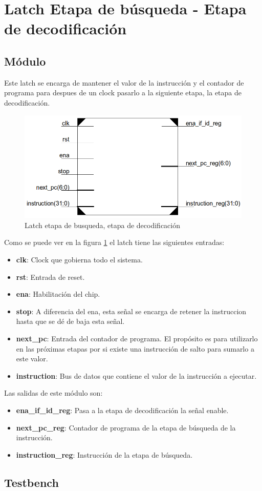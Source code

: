 \section{Latch Etapa de búsqueda - Etapa de decodificaci\'on}
\subsection{M\'odulo}
Este latch se encarga de mantener el valor de la instrucci\'on y el contador de programa para despues de un clock pasarlo a la siguiente etapa, la etapa de decodificaci\'on.

\begin{figure}[H]
\centering
\includegraphics[scale=0.35]{img/latch_if_id}
\caption{Latch etapa de busqueda, etapa de decodificaci\'on}
\label{fig:latchifid}
\end{figure}

Como se puede ver en la figura \ref{fig:latchifid} el latch tiene las siguientes entradas:
\begin{itemize}
  \item \textbf{clk}: Clock que gobierna todo el sistema.
  \item \textbf{rst}: Entrada de reset.
  \item \textbf{ena}: Habilitaci\'on del chip.
  \item \textbf{stop}: A diferencia del ena, esta señal se encarga de retener la instruccion hasta que se d\'e de baja esta señal.
  \item \textbf{next\_pc}: Entrada del contador de programa. El prop\'osito es para utilizarlo en las pr\'oximas etapas por si existe una instrucci\'on de salto para sumarlo a este valor.
  \item \textbf{instruction}: Bus de datos que contiene el valor de la instrucci\'on a ejecutar.  
\end{itemize}

Las salidas de este m\'odulo son:
\begin{itemize}
  \item \textbf{ena\_if\_id\_reg}: Pasa a la etapa de decodificaci\'on la señal enable.
  \item \textbf{next\_pc\_reg}: Contador de programa de la etapa de b\'usqueda de la instrucci\'on.
  \item \textbf{instruction\_reg}: Instrucci\'on de la etapa de b\'usqueda.
\end{itemize}

\subsection{Testbench}